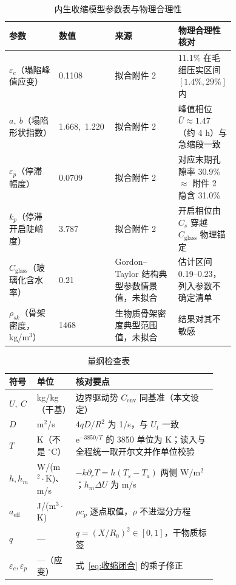 \documentclass[12pt,a4paper]{ctexart}
\numberwithin{equation}{section}
\begin{document}
\begin{table}[H]
\centering
\caption{内生收缩模型参数表与物理合理性}
\label{tab:收缩参数}
\small
\begin{tabular}{>{\raggedright\arraybackslash}p{0.22\linewidth}lp{0.28\linewidth}p{0.24\linewidth}}
\toprule
参数 & 数值 & 来源 & 物理合理性核对 \\
\midrule
$\varepsilon_c$（塌陷峰值应变） & 0.1108 & 拟合附件 2 & 11.1\% 在毛细压实区间 $[1.4\%,29\%]$ 内 \\
$a,\ b$（塌陷形状指数） & 1.668,\ 1.220 & 拟合附件 2 & 峰值相位 $\bar U\approx1.47$（约 4 h）与急缩段一致 \\
$\varepsilon_p$（停滞幅度） & 0.0709 & 拟合附件 2 & 对应末期孔隙率 30.9\% $\approx$ 附件 2 隐含 31.0\% \\
$k_p$（停滞开启陡峭度） & 3.787 & 拟合附件 2 & 开启相位由 $C_s$ 穿越 $C_{\mathrm{glass}}$ 物理锚定 \\
$C_{\mathrm{glass}}$（玻璃化含水率） & 0.21 & Gordon--Taylor 结构典型参数情景值，未拟合 & 估计区间 0.19--0.23，列入参数不确定清单 \\
$\rho_{sk}$（骨架密度，kg/m$^3$） & 1468 & 生物质骨架密度典型范围值，未拟合 & 结果对其不敏感 \\
\bottomrule
\end{tabular}
\end{table}

\begin{table}[H]
\centering
\caption{量纲检查表}
\label{tab:量纲}
\small
\begin{tabular}{llp{0.68\linewidth}}
\toprule
符号 & 单位 & 核对要点 \\
\midrule
$U,\ C$ & kg/kg（干基） & 边界驱动势 $C_{\mathrm{env}}$ 同基准（本文设定） \\
$D$ & m$^2$/s & $4qD/R^2$ 为 1/s，与 $U_t$ 一致 \\
$T$ & K（不是 ${}^\circ$C） & $\mathrm e^{-3850/T}$ 的 3850 单位为 K；读入与全程统一取开尔文并作单位校验 \\
$h,h_m$ & W/(m$^2\cdot$K)、m/s & $-k\partial_rT=h(T_s-T_a)$ 两侧 W/m$^2$；$h_m\Delta U$ 为 m/s \\
$a_{\mathrm{eff}}$ & J/(m$^3\cdot$K) & $\rho c_p$ 逐点取值，$\rho$ 不进湿分方程 \\
$q$ & — & $q=(X/R_0)^2\in[0,1]$，干物质标签 \\
$\varepsilon_c,\varepsilon_p$ & —（应变） & 式~\eqref{eq:收缩闭合} 的乘子修正 \\
\bottomrule
\end{tabular}
\end{table}
\end{document}
